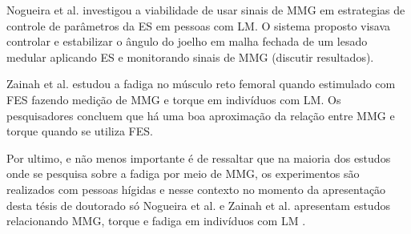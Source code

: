 Nogueira et al. investigou a viabilidade de usar sinais de \acrshort{MMG} em estrategias de controle de parâmetros da \acrshort{ES} em pessoas com \acrshort{LM}. O sistema proposto visava controlar e estabilizar o ângulo do joelho em malha fechada de um lesado medular aplicando \acrshort{ES} e monitorando sinais de \acrshort{MMG} (discutir resultados). 

Zainah et al. estudou a fadiga no músculo reto femoral quando estimulado com \acrshort{FES} fazendo medição de \acrshort{MMG} e torque em indivíduos com \acrshort{LM}. Os pesquisadores concluem que há uma boa aproximação da relação entre \acrshort{MMG} e torque quando se utiliza \acrshort{FES}. 

Por ultimo, e não menos importante é de ressaltar que na maioria dos estudos onde se pesquisa sobre a fadiga por meio de \acrshort{MMG}, os experimentos são realizados com pessoas hígidas e nesse contexto no momento da apresentação desta tésis de doutorado só Nogueira et al. e Zainah et al. apresentam estudos relacionando \acrshort{MMG}, torque e fadiga em indivíduos com \acrshort{LM} \cite{ Zainah2017MechanomyographyInjury, NogueiraNeto2013ViabilidadeNeuromuscular}.



